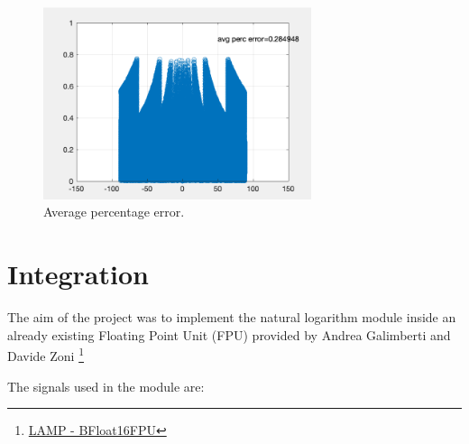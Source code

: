 \documentclass{report}
\begin{document}
\begin{figure}[]
  \centering
    \includegraphics[width=0.7\textwidth]{images/avg_perc_err.png}
    \caption{Average percentage error.}
\end{figure}
\chapter{Integration}
The aim of the project was to implement the natural logarithm module inside an already existing Floating Point Unit (FPU) provided by  Andrea Galimberti and Davide Zoni 
\footnote{\href{https://gitlab.com/davide.zoni/bfloat_fpu_systemverilog} {LAMP - BFloat16FPU} }

The signals used in the module are:
\end{document}
